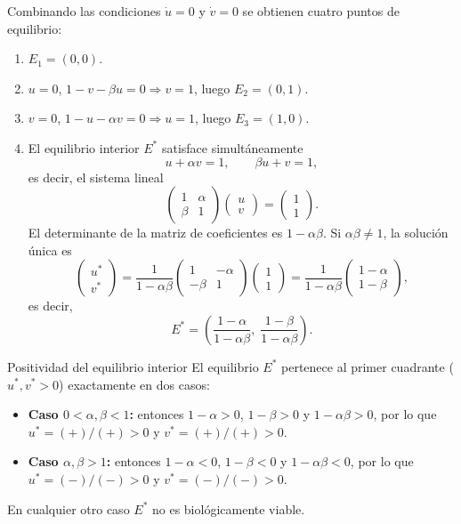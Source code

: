 \documentclass[11pt,letterpaper]{article}
\begin{document}
Combinando las condiciones $\dot u=0$ y $\dot v=0$ se obtienen cuatro puntos de equilibrio:
\begin{enumerate}
    \item $E_1=(0,0)$.
    \item $u=0$, $1-v-\beta u=0 \Rightarrow v=1$, luego $E_2=(0,1)$.
    \item $v=0$, $1-u-\alpha v=0 \Rightarrow u=1$, luego $E_3=(1,0)$.
    \item El equilibrio interior $E^*$ satisface simultáneamente
    \[
    u+\alpha v=1,\qquad \beta u+v=1,
    \]
    es decir, el sistema lineal
    \[
    \begin{pmatrix}1 & \alpha\\ \beta & 1\end{pmatrix}
    \begin{pmatrix}u\\v\end{pmatrix}
    =\begin{pmatrix}1\\1\end{pmatrix}.
    \]
    El determinante de la matriz de coeficientes es $1-\alpha\beta$. Si $\alpha\beta\neq 1$, la solución única es
    \[
    \begin{pmatrix}u^*\\v^*\end{pmatrix}
    =\frac{1}{1-\alpha\beta}
    \begin{pmatrix}1 & -\alpha\\-\beta & 1\end{pmatrix}
    \begin{pmatrix}1\\1\end{pmatrix}
    =\frac{1}{1-\alpha\beta}\begin{pmatrix}1-\alpha\\1-\beta\end{pmatrix},
    \]
    es decir,
    \[
    \boxed{E^*=\left(\frac{1-\alpha}{1-\alpha\beta},\;\frac{1-\beta}{1-\alpha\beta}\right).}
    \]
\end{enumerate}

\begin{observacion}{Positividad del equilibrio interior}{}
El equilibrio $E^*$ pertenece al primer cuadrante ($u^*,v^*>0$) exactamente en dos casos:
\begin{itemize}
    \item \textbf{Caso $0<\alpha,\beta<1$:} entonces $1-\alpha>0$, $1-\beta>0$ y $1-\alpha\beta>0$,
          por lo que $u^*=(+)/(+)>0$ y $v^*=(+)/(+)>0$.
    \item \textbf{Caso $\alpha,\beta>1$:} entonces $1-\alpha<0$, $1-\beta<0$ y $1-\alpha\beta<0$,
          por lo que $u^*=(-)/(-)>0$ y $v^*=(-)/(-)>0$.
\end{itemize}
En cualquier otro caso $E^*$ no es biológicamente viable.
\end{observacion}
\end{document}
